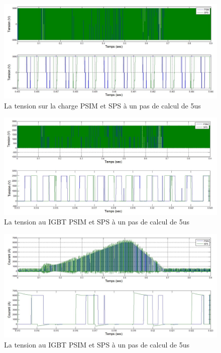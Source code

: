 \documentclass[11pt,letterpaper,final]{report}
\begin{document}
\begin{figure}[h!]
\centering
\includegraphics[scale=0.5]{Fig/DCPDCN/DCPTensionCharge5u.jpg}
\caption{La tension sur la charge PSIM et SPS à un pas de calcul de 5us}
\label{DC_ch_ten_5}
\end{figure}

\begin{figure}[h!]
\centering
\includegraphics[scale=0.5]{Fig/DCPDCN/DCPTensionIGBT5u.jpg}
\caption{La tension au IGBT PSIM et SPS à un pas de calcul de 5us}
\label{DC_IG_ten_5}
\end{figure}

\begin{figure}[h!]
\centering
\includegraphics[scale=0.5]{Fig/DCPDCN/DCPCourantIGBT5u.jpg}
\caption{La tension au IGBT PSIM et SPS à un pas de calcul de 5us}
\label{DC_IG_cou_5}
\end{figure}
\end{document}
